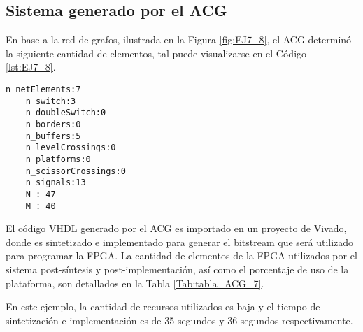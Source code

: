 \subsection{Sistema generado por el ACG}

	En base a la red de grafos, ilustrada en la Figura \ref{fig:EJ7_8}, el ACG determinó la siguiente cantidad de elementos, tal puede visualizarse en el Código \ref{lst:EJ7_8}.
	
	\begin{lstlisting}[language = {}, caption = Cantidad de elementos a implementar por el ACG, label = {lst:EJ7_8}]
	n_netElements:7
	n_switch:3
	n_doubleSwitch:0
	n_borders:0
	n_buffers:5
	n_levelCrossings:0
	n_platforms:0
	n_scissorCrossings:0
	n_signals:13
	N : 47
	M : 40
	\end{lstlisting}
	
	El código VHDL generado por el ACG es importado en un proyecto de Vivado, donde es sintetizado e implementado para generar el bitstream que será utilizado para programar la FPGA. La cantidad de elementos de la FPGA utilizados por el sistema post-síntesis y post-implementación, así como el porcentaje de uso de la plataforma, son detallados en la Tabla \ref{Tab:tabla_ACG_7}.
	
	\begin{table}[H]
		{
			\caption{Síntesis e implementación del ejemplo 7 generado por el ACG.}
			\label{Tab:tabla_ACG_7}
			\centering
			\begin{center}
			\end{center}
		}    
	\end{table}
	
	En este ejemplo, la cantidad de recursos utilizados es baja y el tiempo de sintetización e implementación es de 35 segundos y 36 segundos respectivamente.
